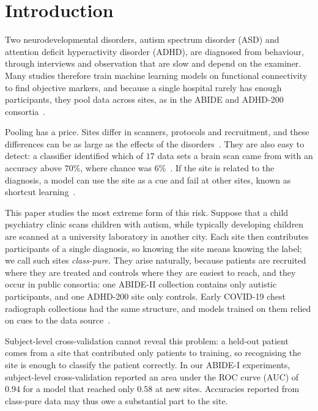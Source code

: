 \section{Introduction}\label{sec:intro}

Two neurodevelopmental disorders, autism spectrum disorder (ASD) and attention deficit hyperactivity disorder (ADHD), are diagnosed from behaviour, through interviews and observation that are slow and depend on the examiner. Many studies therefore train machine learning models on functional connectivity to find objective markers, and because a single hospital rarely has enough participants, they pool data across sites, as in the ABIDE and ADHD-200 consortia~\cite{dimartino2014,bellec2017}.

Pooling has a price. Sites differ in scanners, protocols and recruitment, and these differences can be as large as the effects of the disorders~\cite{yamashita2019}. They are also easy to detect: a classifier identified which of $17$ data sets a brain scan came from with an accuracy above $70\%$, where chance was $6\%$~\cite{wachinger2021}. If the site is related to the diagnosis, a model can use the site as a cue and fail at other sites, known as shortcut learning~\cite{geirhos2020,zech2018}.

This paper studies the most extreme form of this risk. Suppose that a child psychiatry clinic scans children with autism, while typically developing children are scanned at a university laboratory in another city. Each site then contributes participants of a single diagnosis, so knowing the site means knowing the label; we call such sites \emph{class-pure}. They arise naturally, because patients are recruited where they are treated and controls where they are easiest to reach, and they occur in public consortia: one ABIDE-II collection contains only autistic participants, and one ADHD-200 site only controls. Early COVID-19 chest radiograph collections had the same structure, and models trained on them relied on cues to the data source~\cite{degrave2021}.

Subject-level cross-validation cannot reveal this problem: a held-out patient comes from a site that contributed only patients to training, so recognising the site is enough to classify the patient correctly. In our ABIDE-I experiments, subject-level cross-validation reported an area under the ROC curve (AUC) of $0.94$ for a model that reached only $0.58$ at new sites. Accuracies reported from class-pure data may thus owe a substantial part to the site.


